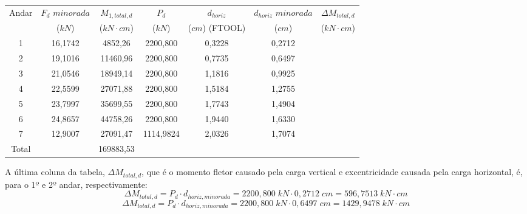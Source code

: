 \begin{table}[H]
\centering
\begin{tabular}{c|c|c|ccc|c}
\hline
Andar & $F_d$ $minorada$ & $M_{1, total, d}$ & \multicolumn{1}{c|}{$P_d$} & \multicolumn{1}{c|}{$d_{horiz}$} & $d_{horiz}$ $minorada$ & $\Delta M_{total, d}$ \\
 & ($kN$) & ($kN\cdot cm$) & \multicolumn{1}{c|}{($kN$)} & \multicolumn{1}{c|}{($cm$) (FTOOL)} & ($cm$) & ($kN\cdot cm$) \\ \hline
1 & 16,1742 & 4852,26 & \multicolumn{1}{c|}{2200,800} & \multicolumn{1}{c|}{0,3228} & 0,2712 &  \\
2 & 19,1016 & 11460,96 & \multicolumn{1}{c|}{2200,800} & \multicolumn{1}{c|}{0,7735} & 0,6497 &  \\
3 & 21,0546 & 18949,14 & \multicolumn{1}{c|}{2200,800} & \multicolumn{1}{c|}{1,1816} & 0,9925 &  \\
4 & 22,5599 & 27071,88 & \multicolumn{1}{c|}{2200,800} & \multicolumn{1}{c|}{1,5184} & 1,2755 &  \\
5 & 23,7997 & 35699,55 & \multicolumn{1}{c|}{2200,800} & \multicolumn{1}{c|}{1,7743} & 1,4904 &  \\
6 & 24,8657 & 44758,26 & \multicolumn{1}{c|}{2200,800} & \multicolumn{1}{c|}{1,9440} & 1,6330 &  \\
7 & 12,9007 & 27091,47 & \multicolumn{1}{c|}{1114,9824} & \multicolumn{1}{c|}{2,0326} & 1,7074 &  \\ \hline
Total &  & 169883,53 &  &  &  &  \\ \cline{1-1} \cline{3-3} \cline{7-7} 
\end{tabular}
\end{table}

A última coluna da tabela, $\Delta M_{total, d}$, que é o momento fletor causado pela carga vertical e excentricidade causada pela carga horizontal, é, para o 1º e 2º andar, respectivamente:
$$\Delta M_{total, d}=P_d\cdot d_{horiz, minorada}=2200,800\;kN\cdot0,2712\;cm=596,7513\;kN\cdot cm$$
$$\Delta M_{total, d}=P_d\cdot d_{horiz, minorada}=2200,800\;kN\cdot0,6497\;cm=1429,9478\;kN\cdot cm$$